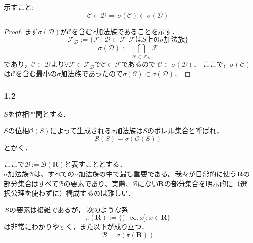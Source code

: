 \documentclass{jsarticle}
\begin{document}
\begin{itembox}[l]{}
示すこと:
\begin{equation}
    \mathcal{C} \subset \mathcal{D} \Longrightarrow \sigma(\mathcal{C}) \subset \sigma(\mathcal{D}) \nonumber 
\end{equation}
\begin{proof}
    まず$\sigma(\mathcal{D})$が$\mathcal{C}$を含む$\sigma$加法族であることを示す．
\begin{equation}
    \mathcal{F}_{\mathcal{D}}:=\{\mathcal{F}\ |\ \mathcal{D}\subset\mathcal{F},\mathcal{F}は S 上の \sigma 加法族\}\nonumber
\end{equation}
\begin{equation}
    \sigma(\mathcal{D}):=\bigcap_{\mathcal{F}\in\mathcal{F}_{\mathcal{D}}}\mathcal{F} \nonumber
\end{equation}
であり，$\mathcal{C} \subset \mathcal{D}$より$\forall\mathcal{F}\in\mathcal{F}_{\mathcal{D}}$で$\mathcal{C} \subset \mathcal{F}$であるので $\mathcal{C} \subset \sigma(\mathcal{D})$．
ここで，$\sigma(\mathcal{C})$は$\mathcal{C}$を含む最小の$\sigma$加法族であったので$\sigma(\mathcal{C})\subset \sigma(\mathcal{D})$．
\end{proof}

\end{itembox}


\subsubsection*{1.2}
$S$を位相空間とする．

$S$の位相$\mathcal{O}(S)$によって生成される$\sigma$加法族は$S$のボレル集合と呼ばれ，
\begin{equation}
    \mathcal{B}(S)=\sigma(\mathcal{O}(S)) \nonumber
\end{equation}
とかく．

ここで$\mathcal{B}:=\mathcal{B}(\mathbf{R})$と表すこととする．
\\

$\sigma$加法族$\mathcal{B}$は、すべての$\sigma$加法族の中で最も重要である。我々が日常的に使う$\mathbf{R}$の部分集合はすべて$\mathcal{B}$の要素であり、実際、$\mathcal{B}$にない$\mathbf{R}$の部分集合を明示的に（選択公理を使わずに）構成するのは難しい．

$\mathcal{B}$の要素は複雑であるが，
次のような系
\begin{equation}
    \pi(\mathbf{R}):=\{(-\infty ,x]:x\in\mathbf{R}\} \nonumber
\end{equation}
は非常にわかりやすく，また以下が成り立つ．
\begin{equation}
    \mathcal{B}=\sigma(\pi(\mathbf{R}))
\end{equation}
\end{document}
